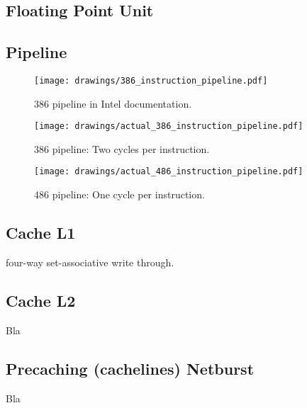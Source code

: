 \subsection{Floating Point Unit}


\subsection{Pipeline}



\begin{figure}[H]
\centering
\texttt{[image: drawings/386\_instruction\_pipeline.pdf]}
\caption{386 pipeline in Intel documentation.}
\end{figure}
\par


\begin{figure}[H]
\centering
\texttt{[image: drawings/actual\_386\_instruction\_pipeline.pdf]}
\caption{386 pipeline: Two cycles per instruction.}
\end{figure}
\par

\begin{figure}[H]
\centering
\texttt{[image: drawings/actual\_486\_instruction\_pipeline.pdf]}
\caption{486 pipeline: One cycle per instruction.}
\end{figure}
\par

\subsection{Cache L1}
four-way set-associative write through.\\

\subsection{Cache L2}
Bla
\subsection{Precaching (cachelines) Netburst}
Bla













